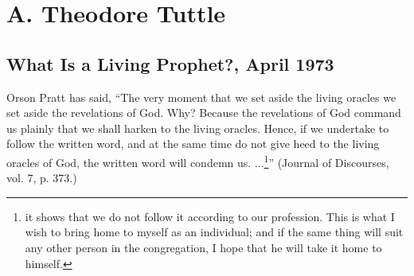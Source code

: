 \section{A. Theodore Tuttle}

\subsection{What Is a Living Prophet?, April 1973}

Orson Pratt has said, ``The very moment that we set aside the living oracles we set aside the revelations of God. Why? Because the revelations of God command us plainly that we shall harken to the living oracles. Hence, if we undertake to follow the written word, and at the same time do not give heed to the living oracles of God, the written word will condemn us. ...\footnote{it shows that we do not follow it according to our profession. This is what I wish to bring home to myself as an individual; and if the same thing will suit any other person in the congregation, I hope that he will take it home to himself.}” (Journal of Discourses, vol. 7, p. 373.)